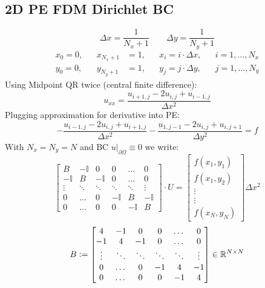 \subsection{2D PE FDM \texorpdfstring{\hfill}{-} Dirichlet BC}\label{subsec::2DPEFDM}
    \vspace{-0.5em}
    $$
        \Delta x = \frac{1}{N_x+1} \qquad \Delta y = \frac{1}{N_y+1}
    $$
    \begin{align*}
        x_0 = 0, && x_{N_x+1} &= 1, && x_i = i \cdot \Delta x, && i = 1, \dots ,N_x\\
        y_0 = 0, && y_{N_y+1} &= 1, && y_j = j \cdot \Delta y, && j = 1, \dots ,N_y
    \end{align*}
    Using Midpoint QR twice (central finite difference):
    $$
        u_{xx} = \frac{u_{i+1,j}-2u_{i,j}+u_{i-1,j}}{\Delta x^2}
    $$
    Plugging approximation for derivative into PE:
    $$
        - \frac{u_{i-1,j}-2u_{i,j}+u_{i+1,j}}{\Delta x^2} - \frac{u_{1,j-1}-2u_{i,j}+u_{i,j+1}}{\Delta y^2} = f
    $$
    With $N_x = N_y = N$ and BC $u\rvert_{\partial \Omega} \equiv 0$ we write:
    $$
        \!\!\!
        \begin{bmatrix}
            B & -\mathbb{I} &  0 & 0 & \dots & 0 \\
            -\mathbb{I} &  B & -\mathbb{I} & 0 & \dots & 0 \\
            \vdots & \ddots & \ddots & \ddots & \ddots & \vdots \\
            0 & \dots & 0 & -\mathbb{I} &  B & -\mathbb{I} \\
            0 & \dots & 0 & 0 &  -\mathbb{I} &  B 
        \end{bmatrix}
        \cdot U
        = 
        \!\!
        \begin{bmatrix}
            f(x_1,y_1) \\ f(x_1,y_2) \\ \vdots \\ \vdots\\ f(x_N,y_N)
        \end{bmatrix}
        \!
        \Delta x^2
    $$
    $$
        B \vcentcolon= 
        \begin{bmatrix}
            4 & -1 &  0 & 0 & \dots & 0 \\
            -1 &  4 & -1 & 0 & \dots & 0 \\
            \vdots & \ddots & \ddots & \ddots & \ddots & \vdots \\
            0 & \dots & 0 & -1 &  4 & -1 \\
            0 & \dots & 0 & 0 &  -1 &  4 
        \end{bmatrix}
        \in \mathbb{R}^{N \times N}
    $$